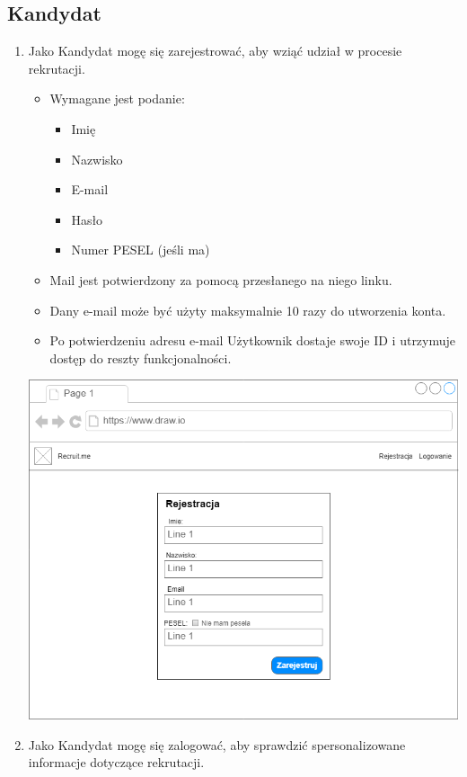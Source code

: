 \documentclass{article}
\begin{document}
\subsection{Kandydat}
\begin{enumerate}
    \item Jako Kandydat mogę się zarejestrować, aby wziąć udział w procesie rekrutacji.
        \begin{itemize}
            \item Wymagane jest podanie: 
                \begin{itemize}
                    \item Imię
                    \item Nazwisko
                    \item E-mail
                    \item Hasło
                    \item Numer PESEL (jeśli ma)
                \end{itemize}
            \item Mail jest potwierdzony za pomocą przesłanego na niego linku.
            \item Dany e-mail może być użyty maksymalnie 10 razy do utworzenia konta.
            \item Po potwierdzeniu adresu e-mail Użytkownik dostaje swoje ID i utrzymuje dostęp do reszty funkcjonalności.
        \end{itemize}
\includegraphics[width=\linewidth,height=\textheight,keepaspectratio=true]{images/rejestracjaMockup.png}
    \item Jako Kandydat mogę się zalogować, aby sprawdzić spersonalizowane informacje dotyczące rekrutacji.

\end{enumerate}
\end{document}

